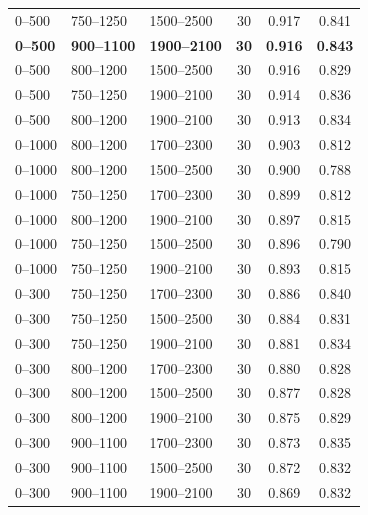 \documentclass[11pt]{article}
\begin{document}
\begin{table}[H]
\begin{tabular}{lllccc}
0--500 & 750--1250 & 1500--2500 & 30 & 0.917 & 0.841 \\
\textbf{0--500} & \textbf{900--1100} & \textbf{1900--2100} & \textbf{30} & \textbf{0.916} & \textbf{0.843} \\
0--500 & 800--1200 & 1500--2500 & 30 & 0.916 & 0.829 \\
0--500 & 750--1250 & 1900--2100 & 30 & 0.914 & 0.836 \\
0--500 & 800--1200 & 1900--2100 & 30 & 0.913 & 0.834 \\
0--1000 & 800--1200 & 1700--2300 & 30 & 0.903 & 0.812 \\
0--1000 & 800--1200 & 1500--2500 & 30 & 0.900 & 0.788 \\
0--1000 & 750--1250 & 1700--2300 & 30 & 0.899 & 0.812 \\
0--1000 & 800--1200 & 1900--2100 & 30 & 0.897 & 0.815 \\
0--1000 & 750--1250 & 1500--2500 & 30 & 0.896 & 0.790 \\
0--1000 & 750--1250 & 1900--2100 & 30 & 0.893 & 0.815 \\
0--300 & 750--1250 & 1700--2300 & 30 & 0.886 & 0.840 \\
0--300 & 750--1250 & 1500--2500 & 30 & 0.884 & 0.831 \\
0--300 & 750--1250 & 1900--2100 & 30 & 0.881 & 0.834 \\
0--300 & 800--1200 & 1700--2300 & 30 & 0.880 & 0.828 \\
0--300 & 800--1200 & 1500--2500 & 30 & 0.877 & 0.828 \\
0--300 & 800--1200 & 1900--2100 & 30 & 0.875 & 0.829 \\
0--300 & 900--1100 & 1700--2300 & 30 & 0.873 & 0.835 \\
0--300 & 900--1100 & 1500--2500 & 30 & 0.872 & 0.832 \\
0--300 & 900--1100 & 1900--2100 & 30 & 0.869 & 0.832 \\
\bottomrule
\end{tabular}
\end{table}
\end{document}
